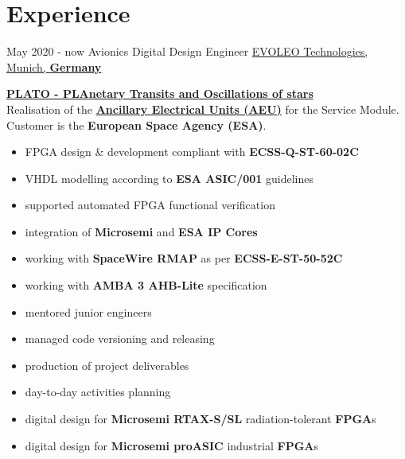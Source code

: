 \documentclass[letterpaper]{twentysecondcv} %
\begin{document}
\makeprofile %

%
%
\section{Experience}

\begin{twenty} %
    \twentyitem
    	{May 2020 -}
		{now}
        {Avionics Digital Design Engineer}
        {\href{http://evoleotech.com/company/}{EVOLEO Technologies, Munich, \textbf{Germany}}}
        {}
        {
            \textbf{\href{https://sci.esa.int/web/plato}{PLATO - PLAnetary Transits and Oscillations of stars}}\\
            Realisation of the
            \href{https://platomission.com/2018/05/15/ancillary-electrical-units-aeu-2/}{\textbf{Ancillary
            Electrical Units (AEU)}} for the Service Module. Customer is the
            \textbf{European Space Agency (ESA)}.
            \vspace{1 mm}
            \begin{itemize}
                \item FPGA design \& development compliant with \textbf{ECSS-Q-ST-60-02C}
                \item VHDL modelling according to \textbf{ESA ASIC/001} guidelines
                \item supported automated FPGA functional verification
                \item integration of \textbf{Microsemi} and \textbf{ESA IP Cores}
                \item working with \textbf{SpaceWire RMAP} as per \textbf{ECSS-E-ST-50-52C}
                \item working with \textbf{AMBA 3 AHB-Lite} specification
                \item mentored junior engineers
                \item managed code versioning and releasing
                \item production of project deliverables
                \item day-to-day activities planning
                \item digital design for \textbf{Microsemi RTAX-S/SL} radiation-tolerant \textbf{FPGA}s
                \item digital design for \textbf{Microsemi proASIC} industrial \textbf{FPGA}s
            \end{itemize}

}
\end{twenty}
\end{document}
